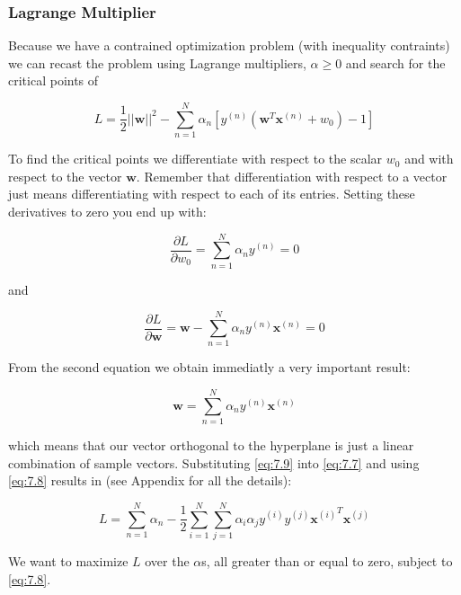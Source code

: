 \documentclass[11pt]{article}
\begin{document}
    \subsubsection{Lagrange Multiplier}\label{lagrange-multiplier}

Because we have a contrained optimization problem (with inequality
contraints) we can recast the problem using Lagrange multipliers,
$\alpha \ge 0$ and search for the critical points of

\begin{equation}\label{eq:7.7}
L = \frac{1}{2} \vert\vert \mathbf{w} \vert\vert^2 - \sum\limits_{n=1}^N \alpha_n \left[ y^{(n)} \left( \mathbf{w}^T \mathbf{x}^{(n)} + w_0 \right) -1 \right]
\end{equation}

To find the critical points we differentiate with respect to the scalar
$w_0$ and with respect to the vector $\mathbf{w}$. Remember that
differentiation with respect to a vector just means differentiating with
respect to each of its entries. Setting these derivatives to zero you
end up with:

\begin{equation}\label{eq:7.8}
\frac{\partial L}{\partial w_0} = \sum\limits_{n=1}^N \alpha_n  y^{(n)} = 0
\end{equation}

and

\begin{equation}\label{eq:7.9}
\frac{\partial L}{\partial \mathbf{w}} = \mathbf{w} - \sum\limits_{n=1}^N \alpha_n  y^{(n)} \mathbf{x}^{(n)} = 0
\end{equation}

From the second equation we obtain immediatly a very important result:

$$
\mathbf{w} = \sum\limits_{n=1}^N \alpha_n  y^{(n)} \mathbf{x}^{(n)}
$$

which means that our vector orthogonal to the hyperplane is just a
linear combination of sample vectors. Substituting \eqref{eq:7.9} into
\eqref{eq:7.7} and using \eqref{eq:7.8} results in (see Appendix for all
the details):

\begin{equation}
L = \sum\limits_{n=1}^N \alpha_n - \frac{1}{2} \sum\limits_{i=1}^N \sum\limits_{j=1}^N \alpha_i \alpha_j y^{(i)}y^{(j)} 
{\mathbf{x}^{(i)}}^T \mathbf{x}^{(j)} 
\end{equation}

We want to maximize $L$ over the $\alpha$s, all greater than or
equal to zero, subject to \eqref{eq:7.8}.
\end{document}
